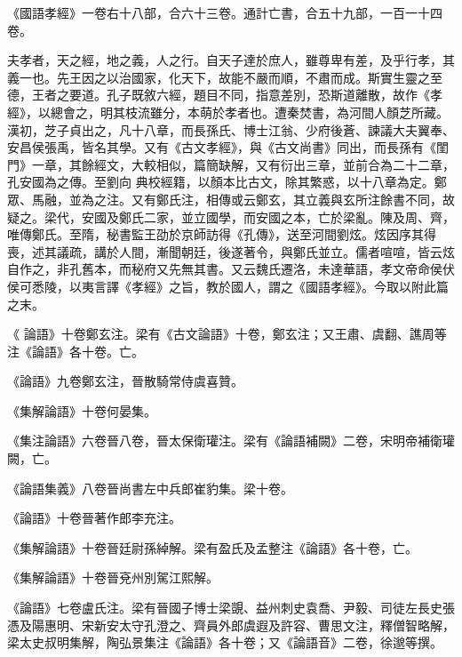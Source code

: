 \begin{pinyinscope}
 《國語孝經》一卷右十八部，合六十三卷。通計亡書，合五十九部，一百一十四卷。



 夫孝者，天之經，地之義，人之行。自天子達於庶人，雖尊卑有差，及乎行孝，其義一也。先王因之以治國家，化天下，故能不嚴而順，不肅而成。斯實生靈之至德，王者之要道。孔子既敘六經，題目不同，指意差別，恐斯道離散，故作《孝經》，以總會之，明其枝流雖分，本萌於孝者也。遭秦焚書，為河間人顏芝所藏。漢初，芝子貞出之，凡十八章，而長孫氏、博士江翁、少府後蒼、諫議大夫翼奉、安昌侯張禹，皆名其學。又有《古文孝經》，與《古文尚書》同出，而長孫有《閨門》一章，其餘經文，大較相似，篇簡缺解，又有衍出三章，並前合為二十二章，孔安國為之傳。至劉向
 典校經籍，以顏本比古文，除其繁惑，以十八章為定。鄭眾、馬融，並為之注。又有鄭氏注，相傳或云鄭玄，其立義與玄所注餘書不同，故疑之。梁代，安國及鄭氏二家，並立國學，而安國之本，亡於梁亂。陳及周、齊，唯傳鄭氏。至隋，秘書監王劭於京師訪得《孔傳》，送至河間劉炫。炫因序其得喪，述其議疏，講於人間，漸聞朝廷，後遂著令，與鄭氏並立。儒者喧喧，皆云炫自作之，非孔舊本，而秘府又先無其書。又云魏氏遷洛，未達華語，孝文帝命侯伏侯可悉陵，以夷言譯《孝經》之旨，教於國人，謂之《國語孝經》。今取以附此篇之末。



 《
 論語》十卷鄭玄注。梁有《古文論語》十卷，鄭玄注；又王肅、虞翻、譙周等注《論語》各十卷。亡。



 《論語》九卷鄭玄注，晉散騎常侍虞喜贊。



 《集解論語》十卷何晏集。



 《集注論語》六卷晉八卷，晉太保衛瓘注。梁有《論語補闕》二卷，宋明帝補衛瓘闕，亡。



 《論語集義》八卷晉尚書左中兵郎崔豹集。梁十卷。



 《論語》十卷晉著作郎李充注。



 《集解論語》十卷晉廷尉孫綽解。梁有盈氏及孟整注《論語》各十卷，亡。



 《集解論語》十卷晉兗州別駕江熙解。



 《論語》七卷盧氏注。梁有晉國子博士梁覬、益州刺史袁喬、尹毅、司徒左長史張憑及陽惠明、宋新安太守孔澄之、齊員外郎虞遐及許容、曹思文注，釋僧智略解，梁太史叔明集解，陶弘景集注《論語》各十卷；又《論語音》二卷，徐邈等撰。




\end{pinyinscope}
